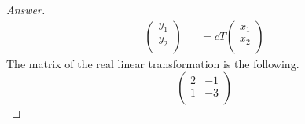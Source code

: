 \documentclass[../psets.tex]{subfiles}
\begin{document}
\begin{enumerate}[label={\textbf{3.\arabic*.}}]
\begin{enumerate}
\begin{proof}[Answer]
\begin{align*}
\begin{pmatrix}
                    y_1\\
                    y_2\\
                \end{pmatrix}&
                    &= cT
                    \begin{pmatrix}
                        x_1\\
                        x_2\\
                    \end{pmatrix}
            \end{align*}
            The matrix of the real linear transformation is the following.
            \begin{equation*}
                \begin{pmatrix}
                    2 & -1\\
                    1 & -3\\
                \end{pmatrix}
            \end{equation*}
        \end{proof}
    \end{enumerate}
\end{enumerate}
\end{document}
